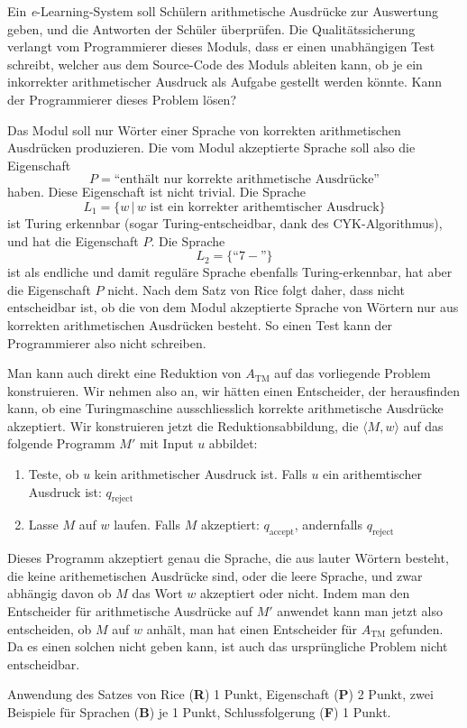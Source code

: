 Ein {\it e}-Learning-System soll Schülern arithmetische Ausdrücke
zur Auswertung geben, und die Antworten der Schüler überprüfen.
Die Qualitätssicherung verlangt vom Programmierer dieses Moduls, dass
er einen unabhängigen Test schreibt, welcher aus dem Source-Code
des Moduls ableiten kann, ob je ein inkorrekter arithmetischer Ausdruck
als Aufgabe gestellt werden könnte. Kann der Programmierer dieses
Problem lösen?


\begin{loesung}
Das Modul soll nur Wörter einer Sprache von korrekten arithmetischen
Ausdrücken produzieren.
Die vom Modul akzeptierte Sprache soll also die Eigenschaft
\[
P=\text{``enthält nur korrekte arithmetische Ausdrücke''}
\]
haben. 
Diese Eigenschaft ist nicht trivial. Die Sprache
\[
L_1=\{w\,|\,\text{$w$ ist ein korrekter arithemtischer Ausdruck}\}
\]
ist Turing erkennbar (sogar Turing-entscheidbar, dank des CYK-Algorithmus),
und hat die Eigenschaft $P$.
Die Sprache
\[
L_2=\{ \text{``$7-$''}\}
\]
ist als endliche und damit reguläre Sprache ebenfalls Turing-erkennbar,
hat aber die Eigenschaft $P$ nicht. Nach dem Satz von Rice folgt daher,
dass nicht entscheidbar ist, ob die von dem Modul akzeptierte Sprache
von Wörtern nur aus korrekten arithmetischen Ausdrücken besteht.
So einen Test kann der Programmierer also nicht schreiben.
\end{loesung}

\begin{loesung}
Man kann auch direkt eine Reduktion von $A_{\text{TM}}$ auf das vorliegende
Problem konstruieren.  Wir nehmen also an, wir hätten einen Entscheider,
der herausfinden kann, ob eine Turingmaschine ausschliesslich korrekte
arithmetische Ausdrücke akzeptiert. Wir konstruieren jetzt die
Reduktionsabbildung, die $\langle M,w\rangle$ auf das folgende
Programm $M'$ mit Input $u$ abbildet:
\begin{enumerate}
\item Teste, ob $u$ kein arithmetischer Ausdruck ist. Falls 
$u$ ein arithemtischer Ausdruck ist: $q_\text{reject}$
\item Lasse $M$ auf $w$ laufen. Falls $M$ akzeptiert: $q_\text{accept}$,
andernfalls $q_\text{reject}$
\end{enumerate}
Dieses Programm akzeptiert genau die Sprache, die aus lauter Wörtern
besteht, die keine arithemetischen Ausdrücke sind, oder die leere
Sprache, und zwar abhängig davon ob $M$ das Wort $w$ akzeptiert
oder nicht. Indem man den Entscheider für arithmetische Ausdrücke
auf $M'$ anwendet kann man jetzt also entscheiden, ob $M$ auf $w$
anhält, man hat einen Entscheider für $A_\text{TM}$ gefunden.
Da es einen solchen nicht geben kann, ist auch das ursprüngliche
Problem nicht entscheidbar.
\end{loesung}

\begin{bewertung}
Anwendung des Satzes von Rice ({\bf R}) 1 Punkt,
Eigenschaft ({\bf P}) 2 Punkt,
zwei Beispiele für Sprachen ({\bf B}) je 1 Punkt,
Schlussfolgerung ({\bf F}) 1 Punkt.
\end{bewertung}
